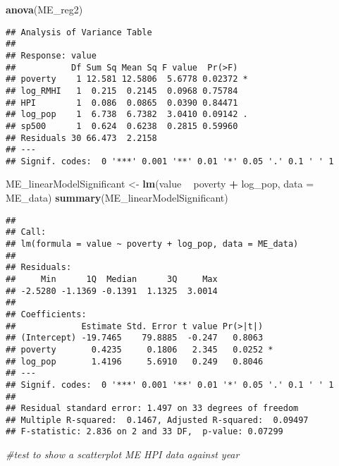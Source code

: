 \documentclass[
]{article}
\newenvironment{Shaded}{\begin{snugshade}}{\end{snugshade}}
\newcommand{\CommentTok}[1]{\textcolor[rgb]{0.56,0.35,0.01}{\textit{#1}}}
\newcommand{\DataTypeTok}[1]{\textcolor[rgb]{0.13,0.29,0.53}{#1}}
\newcommand{\KeywordTok}[1]{\textcolor[rgb]{0.13,0.29,0.53}{\textbf{#1}}}
\newcommand{\NormalTok}[1]{#1}
\newcommand{\OperatorTok}[1]{\textcolor[rgb]{0.81,0.36,0.00}{\textbf{#1}}}
\newcommand{\StringTok}[1]{\textcolor[rgb]{0.31,0.60,0.02}{#1}}
\begin{document}
\begin{Shaded}
\begin{Highlighting}[]
\KeywordTok{anova}\NormalTok{(ME_reg2)}
\end{Highlighting}
\end{Shaded}

\begin{verbatim}
## Analysis of Variance Table
## 
## Response: value
##           Df Sum Sq Mean Sq F value  Pr(>F)  
## poverty    1 12.581 12.5806  5.6778 0.02372 *
## log_RMHI   1  0.215  0.2145  0.0968 0.75784  
## HPI        1  0.086  0.0865  0.0390 0.84471  
## log_pop    1  6.738  6.7382  3.0410 0.09142 .
## sp500      1  0.624  0.6238  0.2815 0.59960  
## Residuals 30 66.473  2.2158                  
## ---
## Signif. codes:  0 '***' 0.001 '**' 0.01 '*' 0.05 '.' 0.1 ' ' 1
\end{verbatim}

\begin{Shaded}
\begin{Highlighting}[]
\NormalTok{ME_linearModelSignificant <-}\StringTok{ }\KeywordTok{lm}\NormalTok{(value }\OperatorTok{~}\StringTok{ }\NormalTok{poverty }\OperatorTok{+}\StringTok{ }\NormalTok{log_pop, }\DataTypeTok{data =}\NormalTok{ ME_data)}
\KeywordTok{summary}\NormalTok{(ME_linearModelSignificant)}
\end{Highlighting}
\end{Shaded}

\begin{verbatim}
## 
## Call:
## lm(formula = value ~ poverty + log_pop, data = ME_data)
## 
## Residuals:
##     Min      1Q  Median      3Q     Max 
## -2.5280 -1.1369 -0.1391  1.1325  3.0014 
## 
## Coefficients:
##             Estimate Std. Error t value Pr(>|t|)  
## (Intercept) -19.7465    79.8885  -0.247   0.8063  
## poverty       0.4235     0.1806   2.345   0.0252 *
## log_pop       1.4196     5.6910   0.249   0.8046  
## ---
## Signif. codes:  0 '***' 0.001 '**' 0.01 '*' 0.05 '.' 0.1 ' ' 1
## 
## Residual standard error: 1.497 on 33 degrees of freedom
## Multiple R-squared:  0.1467, Adjusted R-squared:  0.09497 
## F-statistic: 2.836 on 2 and 33 DF,  p-value: 0.07299
\end{verbatim}

\begin{Shaded}
\begin{Highlighting}[]
\CommentTok{#test to show a scatterplot ME HPI data against year}
\end{Highlighting}
\end{Shaded}
\end{document}
